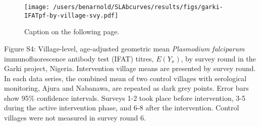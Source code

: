 \documentclass[11pt]{article}
\begin{document}
\clearpage
\begin{figure}[htbp]
\begin{center}
\texttt{[image: /users/benarnold/SLAbcurves/results/figs/garki-IFATpf-by-village-svy.pdf]}
\begin{minipage}{\textwidth}
\caption{Caption on the following page.}
\label{fig:garkiVillageEy}
\end{minipage}
\end{center}
\end{figure}
\clearpage
Figure S4: Village-level, age-adjusted geometric mean \textit{Plasmodium falciparum} immunofluorescence antibody test (IFAT)  titres, $E(Y_x)$, by survey round in the Garki project, Nigeria. Intervention village means are presented by survey round. In each data series, the combined mean of two control villages with serological monitoring, Ajura and Nabanawa, are repeated  as dark grey points. Error bars show 95\% confidence intervals.  Surveys 1-2 took place before intervention, 3-5 during the active intervention phase, and 6-8 after the intervention.  Control villages were not measured in survey round 6.
\end{document}
